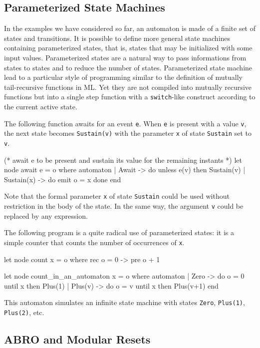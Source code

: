 \documentclass[11pt,titlepage,twoside]{report}
\begin{document}
\subsection{Parameterized State Machines\label{paramstatemachine}} %

In the examples we have considered so far, an automaton is made of a
finite set of states and transitions. It is possible to define more
general state machines containing parameterized states, that is,
states that may be initialized with some input values. Parameterized
states are a natural way to pass informations from states to states
and to reduce the number of states. Parameterized state machine
lead to a particular style of programming similar to the
definition of mutually tail-recursive functions in ML. Yet they are not
compiled into mutually recursive functions but into a single step
function with a \texttt{switch}-like construct according to the current
active state.

The following function awaits for an event \texttt{e}. When \texttt{e} is present with
a value \texttt{v}, the next state becomes \texttt{Sustain(v)} with the parameter
\texttt{x} of state \texttt{Sustain} set to \texttt{v}.
\begin{chklisting}[withresult,label=await]
(* await e to be present and sustain its value for the remaining instants *)
let node await e = o where 
  automaton
  | Await -> do unless e(v) then Sustain(v)
  | Sustain(x) -> do emit o = x done
  end
\end{chklisting}

Note that the formal parameter \verb-x- of state \verb-Sustain- could
be used without restriction in the body of the state. In the same way, the
argument \verb-v- could be replaced by any expression.

\medskip
The following program is a quite radical use of parameterized states: it
is a simple counter that counts the number of
occurrences of \verb-x-.
\begin{chklisting}[withresult]
let node count x = o where rec o = 0 -> pre o + 1

let node count_in_an_automaton x = o where
  automaton
  | Zero -> do o = 0 until x then Plus(1)
  | Plus(v) -> do o = v until x then Plus(v+1)
  end
\end{chklisting}

This automaton simulates an infinite state machine with states
\verb-Zero-, \verb-Plus(1)-, \verb-Plus(2)-, etc.

\subsection{ABRO and Modular Resets\label{resets}} %
\end{document}
